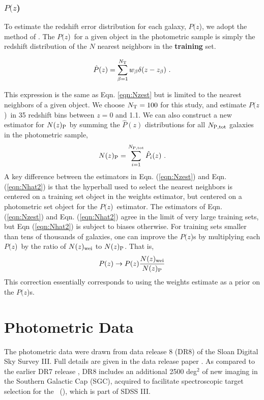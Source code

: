 \documentclass[12pt,preprint]{aastex}
\newcommand{\pofz}{$P(z$)}
\newcommand{\nwei}{N(z)_{\rm wei}}
\newcommand{\npz}{N(z)_{\rm P}}
\begin{document}
\subsubsection{\pofz}

To estimate the redshift error distribution for each galaxy, \pofz,
we adopt the method of \cite{CunhaPhotoz09}. The \pofz\ for a given object in the
photometric sample is simply the redshift distribution of the $N$
nearest neighbors in the {\bf training} set.

\begin{equation}
\hat{P}(z) = \sum_{\beta=1}^{N_{\rm T}} w_\beta \delta(z-z_\beta)~.
\label{eqn:pzest}
\end{equation}

\noindent This expression is the same as Eqn. \ref{eqn:Nzest} but is limited to
the nearest neighbors of a given object.  We choose $N_{\rm T}=100$ for this
study, and estimate \pofz\ in 35 redshift bins between $z=0$ and 1.1.  We can
also construct a new estimator for $N(z)_{\rm P}$ by summing the $\hat{P}(z)$
distributions for all $N_{\rm P,tot}$ galaxies in the photometric
sample,
\begin{equation}
\npz = \sum_{i=1}^{N_{\rm P,tot}}\hat{P}_i(z)~.
\label{eqn:Nhat2}
\end{equation}
\noindent A key difference between the estimators in Eqn. (\ref{eqn:Nzest})
and Eqn. (\ref{eqn:Nhat2}) is that the hyperball used to select the nearest
neighbors is centered on a training set object in the weights estimator, but
centered on a photometric set object for the \pofz\ estimator.  The estimators
of Eqn. (\ref{eqn:Nzest}) and  Eqn. (\ref{eqn:Nhat2}) agree in the limit of
very large training sets, but Eqn (\ref{eqn:Nhat2}) is subject to biases
otherwise.  For training sets smaller than tens of thousands of galaxies, one
can improve the \pofz s by multiplying each \pofz\ by the ratio of $\nwei$ to
$\npz$.  That is,
\begin{equation} \label{eq:pzcorrect}
P(z) \rightarrow P(z)\frac{\nwei}{\npz} \label{eqn:pzcorrect}
\end{equation}
This correction essentially corresponds to using the weights estimate as a
prior on the \pofz s.



\section{Photometric Data} \label{sec:data}

The photometric data were drawn from data release 8 (DR8) of the Sloan Digital
Sky Survey III.  Full details are given in the data release paper \citet{dr8}.
As compared to the earlier DR7 release \citep{dr7}, DR8 includes an additional
2500 deg$^2$ of new imaging in the Southern Galactic Cap (SGC), acquired to
facilitate spectroscopic target selection for the \bossfull\ (\boss), which is
part of SDSS III.
\end{document}
